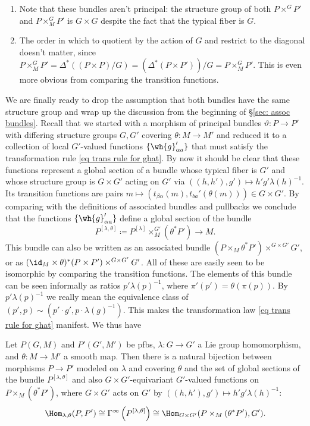 \begin{rem}
\begin{enumerate}
    \item Note that these bundles aren't principal: the structure group of both $P\times^G P'$ and $P\times^G_MP'$ is $G\times G$ despite the fact that the typical fiber is $G$.
    \item The order in which to quotient by the action of $G$ and restrict to the diagonal doesn't matter, since $P\times^G_MP'=\Delta^\ast((P\times P)\slash G)=(\Delta^\ast(P\times P'))\slash G=P\times^G_M P'$. This is even more obvious from comparing the transition functions.
\end{enumerate}
\end{rem}


We are finally ready to drop the assumption that both bundles have the same structure group and wrap up the discussion from the beginning of \S\ref{sec: assoc bundles}. Recall that we started with a morphism of principal bundles $\vartheta:P\to P'$ with differing structure groups $G,G'$ covering $\theta:M\to M'$ and reduced it to a collection of local $G'$-valued functions $\{\wh{g}_{\alpha a}'\}$ that must satisfy the transformation rule \eqref{eq trans rule for ghat}. By now it should be clear that these functions represent a global section of a bundle whose typical fiber is $G'$ and whose structure group is $G\times G'$ acting on $G'$ via $((h,h'),g')\mapsto h'g'\lambda(h)^{-1}$. Its transition functions are pairs $m\mapsto (t_{\beta\alpha}(m),t_{ba}'(\theta(m)))\in G\times G'$. By comparing with the definitions of associated bundles and pullbacks we conclude that the functions $\{\wh{g}_{\alpha a}'\}$ define a global section of the bundle
\[\boxed{P^{[\lambda,\theta]}\coloneqq P^{[\lambda]}\times^{G'}_M(\theta^\ast P')\to M.}\label{eq bundle of pfb morphisms}\]
This bundle can also be written as an associated bundle $(P\times_M \theta^\ast P')\times^{G\times G'} G'$, or as $(\id_M\times \theta)^\ast(P\times P')\times^{G\times G'}G'$. All of these are easily seen to be isomorphic by comparing the transition functions. The elements of this bundle can be seen informally as ratios $p'\lambda(p)^{-1}$, where $\pi'(p')=\theta(\pi(p))$. By $p'\lambda(p)^{-1}$ we really mean the equivalence class of $(p',p)\sim (p'\cdot g', p\cdot \lambda(g)^{-1})$. This makes the transformation law \eqref{eq trans rule for ghat} manifest. We thus have
\begin{prop}\label{prop pfb morphisms}
    Let $P(G,M)$ and $P'(G',M')$ be \glspl{pfb}, $\lambda:G\to G'$ a Lie group homomorphism, and $\theta:M\to M'$ a smooth map. Then there is a natural bijection between morphisms $P\to P'$ modeled on $\lambda$ and covering $\theta$ and the set of global sections of the bundle $P^{[\lambda,\theta]}$ and also $G\times G'$-equivariant $G'$-valued functions on $P\times_M (\theta^\ast P')$, where $G\times G'$ acts on $G'$ by $((h,h'),g')\mapsto h'g'\lambda(h)^{-1}$:
    \[\Hom_{\lambda,\theta}(P,P')\cong \Gamma^\infty\left(P^{[\lambda,\theta]}\right)\cong \Hom_{G\times G'}(P\times_M (\theta^\ast P'),G').\]
\end{prop}

